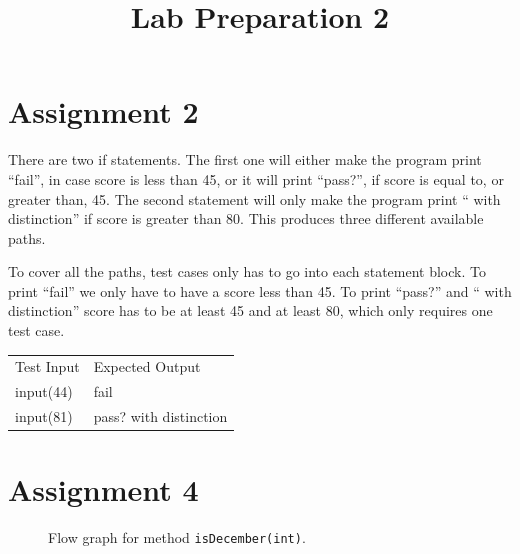 \documentclass[a4paper]{article}
\title{Lab Preparation 2}
\author{}
\date{}
\begin{document}
\maketitle

\section*{Assignment 2}

There are two if statements. The first one will either make the program print ``fail'', in case score is less than 45, or it will print ``pass?'', if score is equal to, or greater than, 45. The second statement will only make the program print `` with distinction'' if score is greater than 80. This produces three different available paths.

To cover all the paths, test cases only has to go into each statement block. To print ``fail'' we only have to have a score less than 45. To print ``pass?'' and `` with distinction'' score has to be at least 45 and at least 80, which only requires one test case. 

\begin{table}[h]
	\begin{tabular}{ll}
		Test Input 	& Expected Output\\
		input(44)	& fail\\
		input(81)	& pass? with distinction\\
	\end{tabular}
\end{table}

\section*{Assignment 4}

\begin{figure}[htpb!]
    \begin{center}
        \caption{Flow graph for method \texttt{isDecember(int)}.}
        \label{figure:december}
    \end{center}
\end{figure}
\end{document}

